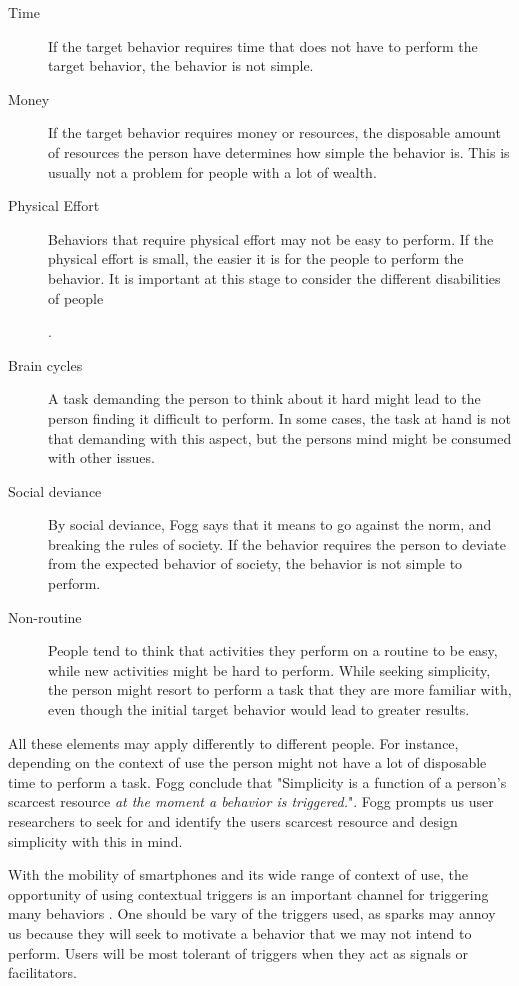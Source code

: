 \begin{description}
  \item[Time] If the target behavior requires time that does not have to perform the target behavior, the behavior is not simple.
  \item[Money] If the target behavior requires money or resources, the disposable amount of resources the person have determines how simple the behavior is. This is usually not a problem for people with a lot of wealth.
  \item[Physical Effort] Behaviors that require physical effort may not be easy to perform. If the physical effort is small, the easier it is for the people to perform the behavior. It is important at this stage to consider the different disabilities of people.
  \item[Brain cycles] A task demanding the person to think about it hard might lead to the person finding it difficult to perform. In some cases, the task at hand is not that demanding with this aspect, but the persons mind might be consumed with other issues.
  \item[Social deviance] By social deviance, Fogg says that it means to go against the norm, and breaking the rules of society. If the behavior requires the person to deviate from the expected behavior of society, the behavior is not simple to perform.
  \item[Non-routine] People tend to think that activities they perform on a routine to be easy, while new activities might be hard to perform. While seeking simplicity, the person might resort to perform a task that they are more familiar with, even though the initial target behavior would lead to greater results.
\end{description}

All these elements may apply differently to different people. For instance, depending on the context of use the person might not have a lot of disposable time to perform a task. Fogg conclude that "Simplicity is a function of a person's scarcest resource \textit{at the moment a behavior is triggered.}". Fogg prompts us user researchers to seek for and identify the users scarcest resource and design simplicity with this in mind.

With the mobility of smartphones and its wide range of context of use, the opportunity of using contextual triggers is an important channel for triggering many behaviors \cite{Fogg2009}. One should be vary of the triggers used, as sparks may annoy us because they will seek to motivate a behavior that we may not intend to perform. Users will be most tolerant of triggers when they act as signals or facilitators.

